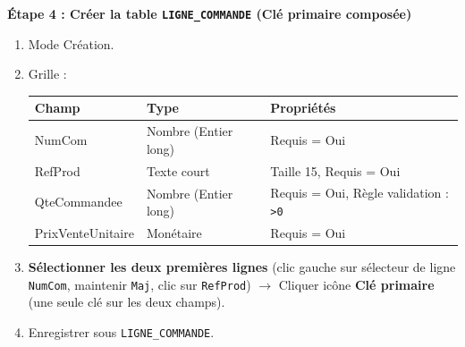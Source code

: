\documentclass[11pt]{article}
\begin{document}
\begin{experience}
\textbf{Étape 4 : Créer la table \texttt{LIGNE\_COMMANDE} (Clé primaire composée)}
\begin{enumerate}
    \item Mode Création.
    \item Grille :
    \begin{center}
    \begin{tabular}{|l|l|l|}
    \hline \textbf{Champ} & \textbf{Type} & \textbf{Propriétés} \\ \hline
    NumCom & Nombre (Entier long) & Requis = Oui \\
    RefProd & Texte court & Taille 15, Requis = Oui \\
    QteCommandee & Nombre (Entier long) & Requis = Oui, Règle validation : \texttt{>0} \\
    PrixVenteUnitaire & Monétaire & Requis = Oui \\ \hline
    \end{tabular}
    \end{center}
    \item \textbf{Sélectionner les deux premières lignes} (clic gauche sur sélecteur de ligne \texttt{NumCom}, maintenir \texttt{Maj}, clic sur \texttt{RefProd}) $\rightarrow$ Cliquer icône \textbf{Clé primaire} (une seule clé sur les deux champs).
    \item Enregistrer sous \texttt{LIGNE\_COMMANDE}.
\end{enumerate}


\end{experience}
\end{document}

